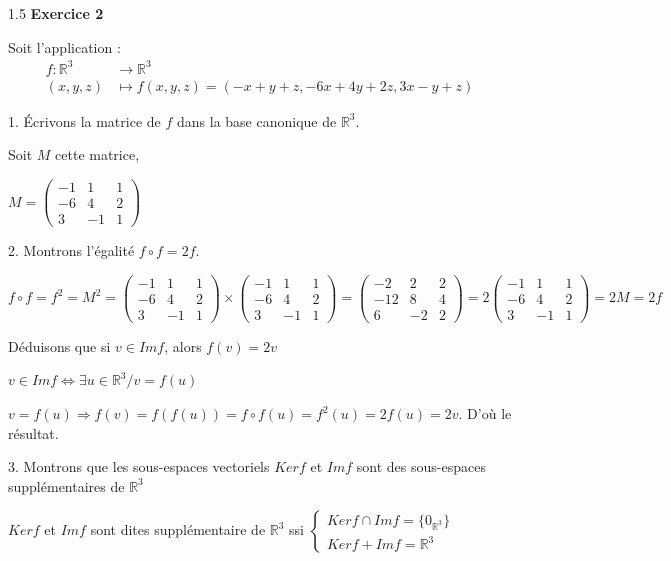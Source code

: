 \documentclass[12pt]{article}
\begin{document}
\begin{spacing}{1.5}
\medskip
\textbf{Exercice 2}

Soit l'application : 
\begin{align*}
f:\mathbb{R}^3 &\longrightarrow \mathbb{R}^3\\
(x,y,z) &\longmapsto f(x,y,z)=(-x+y+z, -6x+4y+2z, 3x-y+z)
\end{align*} 

1. Écrivons la matrice de $f$ dans la base canonique de $\mathbb{R}^3$.

Soit $M$ cette matrice,

$M=\begin{pmatrix}
-1 & 1 & 1 \\ 
-6 & 4 & 2 \\ 
3 & -1 & 1
\end{pmatrix}$ 

2. Montrons l'égalité $f\circ f= 2f$.

$f\circ f=f^2=M^2=\begin{pmatrix}
-1 & 1 & 1 \\ 
-6 & 4 & 2 \\ 
3 & -1 & 1
\end{pmatrix}\times\begin{pmatrix}
-1 & 1 & 1 \\ 
-6 & 4 & 2 \\ 
3 & -1 & 1
\end{pmatrix}=\begin{pmatrix}
-2 & 2 & 2 \\ 
-12 & 8 & 4 \\ 
6 & -2 & 2
\end{pmatrix}=2\begin{pmatrix}
-1 & 1 & 1 \\ 
-6 & 4 & 2 \\ 
3 & -1 & 1
\end{pmatrix}=2M=2f$

\medskip
Déduisons que si $v\in Imf$, alors $f(v)=2v$

$v\in Imf\Leftrightarrow \exists u\in \mathbb{R}^3/v=f(u)$

$v=f(u)\Rightarrow f(v)=f(f(u))=f\circ f(u)=f^2(u)=2f(u)=2v$. D'où le résultat.

3. Montrons que les sous-espaces vectoriels $Kerf$ et $Imf$ sont des sous-espaces supplémentaires de $\mathbb{R}^3$

$Kerf$ et $Imf$ sont dites supplémentaire de $\mathbb{R}^3$ ssi $\begin{cases}
Kerf\cap Imf=\{0_{\mathbb{R}^3}\}\\
Kerf+Imf=\mathbb{R}^3
\end{cases}$


\end{spacing}
\end{document}
